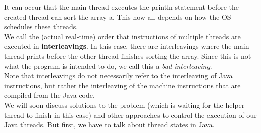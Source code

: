 \documentclass[main.tex]{subfiles}
\begin{document}
It can occur that the main thread executes the println statement before the created thread can sort the array a. This now all depends on how the OS schedules these threads.\\
We call the (actual real-time) order that instructions of multiple threads are executed in \textbf{interleavings}. In this case, there are interleavings where the main thread prints before the other thread finishes sorting the array. Since this is not what the program is intended to do, we call this a \textit{bad interleaving}. \\[3mm]
Note that interleavings do not necessarily refer to the interleaving of Java instructions, but rather the interleaving of the machine instructions that are compiled from the Java code.\\
We will soon discuss solutions to the problem (which is waiting for the helper thread to finish in this case) and other approaches to control the execution of our Java threads. But first, we have to talk about thread states in Java.
\end{document}
